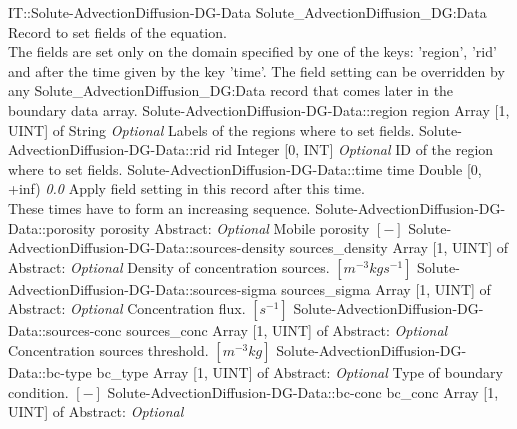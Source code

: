 \begin{RecordType}
	{IT::Solute-AdvectionDiffusion-DG-Data}
	{Solute{\_}AdvectionDiffusion{\_}DG:Data}
	{} %
	{} %
	{{{Record to set fields of the equation.}\\{
The fields are set only on the domain specified by one of the keys: 'region', 'rid'}\\{
and after the time given by the key 'time'. The field setting can be overridden by}\\{
 any Solute{\_}AdvectionDiffusion{\_}DG:Data record that comes later in the boundary data array.}}}
		\RecKey
			{Solute-AdvectionDiffusion-DG-Data::region}
			{region}
			{{Array [1, UINT] of }{String}}
			{ \it{Optional} }
			{{{Labels of the regions where to set fields. }}}
		\RecKey
			{Solute-AdvectionDiffusion-DG-Data::rid}
			{rid}
			{{Integer [0, INT]}}
			{ \it{Optional} }
			{{{ID of the region where to set fields.}}}
		\RecKey
			{Solute-AdvectionDiffusion-DG-Data::time}
			{time}
			{{Double [0, +inf)}}
			{ \it{0.0} }
			{{{Apply field setting in this record after this time.}\\{
These times have to form an increasing sequence.}}}
		\RecKey
			{Solute-AdvectionDiffusion-DG-Data::porosity}
			{porosity}
			{{Abstract}{: }}
			{ \it{Optional} }
			{{{Mobile porosity }{$[-]$}}}
		\RecKey
			{Solute-AdvectionDiffusion-DG-Data::sources-density}
			{sources{\_}density}
			{{Array [1, UINT] of }{Abstract}{: }}
			{ \it{Optional} }
			{{{Density of concentration sources. }{$[m^{-3}kgs^{-1}]$}}}
		\RecKey
			{Solute-AdvectionDiffusion-DG-Data::sources-sigma}
			{sources{\_}sigma}
			{{Array [1, UINT] of }{Abstract}{: }}
			{ \it{Optional} }
			{{{Concentration flux. }{$[s^{-1}]$}}}
		\RecKey
			{Solute-AdvectionDiffusion-DG-Data::sources-conc}
			{sources{\_}conc}
			{{Array [1, UINT] of }{Abstract}{: }}
			{ \it{Optional} }
			{{{Concentration sources threshold. }{$[m^{-3}kg]$}}}
		\RecKey
			{Solute-AdvectionDiffusion-DG-Data::bc-type}
			{bc{\_}type}
			{{Array [1, UINT] of }{Abstract}{: }}
			{ \it{Optional} }
			{{{Type of boundary condition. }{$[-]$}}}
		\RecKey
			{Solute-AdvectionDiffusion-DG-Data::bc-conc}
			{bc{\_}conc}
			{{Array [1, UINT] of }{Abstract}{: }}
			{ \it{Optional} }

\end{RecordType}
